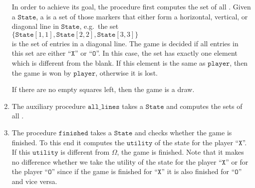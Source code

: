 \begin{enumerate}
      In order to achieve its goal, the procedure first computes the set of all .
      Given a $\mathtt{State}$, a  is a set of those markers that either form a horizontal,
      vertical, or diagonal line in $\mathtt{State}$, e.g.~the set 
      \\[0.2cm]
      \hspace*{1.3cm}
      $\{ \mathtt{State}[1,1], \mathtt{State}[2,2], \mathtt{State}[3,3] \}$
      \\[0.2cm]
      is the set of entries in a diagonal line.  The game is decided if all entries in this set are either
      ``$\mathtt{X}$'' or ``$\mathtt{O}$''.  In this case, the set has exactly one element which is different
      from the blank.  If this element is the same as $\mathtt{player}$, then the game is won by
      $\mathtt{player}$, otherwise it is lost.

      If there are no empty squares left, then the game is a draw.
\item The auxiliary procedure $\mathtt{all\_lines}$ takes a $\mathtt{State}$ and computes the sets of all
      . 
\item The procedure $\mathtt{finished}$ takes a $\mathtt{State}$ and checks whether the game is finished.
      To this end it computes the $\mathtt{utility}$ of the state for the player ``$\mathtt{X}$''.  
      If this $\mathtt{utility}$ is different from $\Omega$, the game is finished.  Note that it makes no
      difference whether we take the utility of the state for the player ``$\mathtt{X}$'' or for the player
      ``$\mathtt{O}$'' since if the game is finished for  ``$\mathtt{X}$'' it is also finished for
      ``$\mathtt{O}$'' and vice versa.
\end{enumerate}

